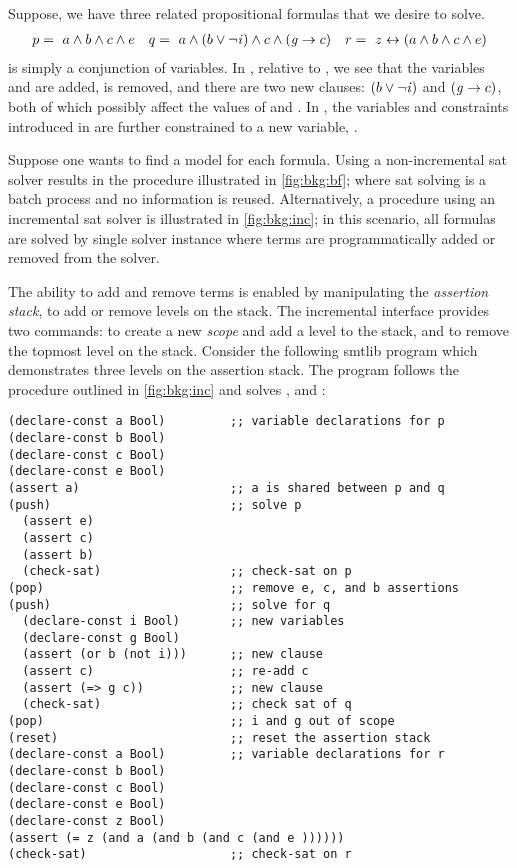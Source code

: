 \label{section:background-incremental}
%
%

%
%
Suppose, we have three related propositional formulas that we desire to solve.
%
\begin{align*}
  p =\ a \wedge b \wedge c \wedge e && q=\ a \wedge (b \vee \neg \mathit{i}{}) \wedge c \wedge (\mathit{g}{} \rightarrow c) && r =~z \leftrightarrow (a \wedge b \wedge c \wedge e)
\end{align*}
%
\pV{} is simply a conjunction of variables. In \qV{}, relative to \pV{}, we see
that the variables \iV{} and \gV{} are added, \eV{} is removed, and there are
two new clauses: $(b \vee \neg \mathit{i}{})$ and $(\mathit{g}{} \rightarrow c)$, both of
which possibly affect the values of \bV{} and \cV{}. In \rV{}, the variables and
constraints introduced in \pV{} are further constrained to a new variable,
\zV{}.

Suppose one wants to find a model for each formula. Using a non-incremental
\ac{sat} solver results in the procedure illustrated in \autoref{fig:bkg:bf};
where \ac{sat} solving is a batch process and no information is reused.
Alternatively, a procedure using an incremental \ac{sat} solver is illustrated
in \autoref{fig:bkg:inc}; in this scenario, all formulas are solved by single
solver instance where terms are programmatically added or removed from the
solver.

The ability to add and remove terms is enabled by manipulating the
\textit{assertion stack}, to add or remove levels on the stack. The incremental
interface provides two commands:  to create a new \emph{scope} and add
a level to the stack, and  to remove the topmost level on the stack.
Consider the following \acl{smtlib} program which demonstrates three levels on
the assertion stack. The program follows the procedure outlined in
\autoref{fig:bkg:inc} and solves \pV, \qV{} and \rV{}:

\begin{lstlisting}[columns=flexible,keepspaces=true,language=SMTLIB]
(declare-const a Bool)         ;; variable declarations for p
(declare-const b Bool)
(declare-const c Bool)
(declare-const e Bool)
(assert a)                     ;; a is shared between p and q
(push)                         ;; solve p
  (assert e)
  (assert c)
  (assert b)
  (check-sat)                  ;; check-sat on p
(pop)                          ;; remove e, c, and b assertions
(push)                         ;; solve for q
  (declare-const i Bool)       ;; new variables
  (declare-const g Bool)
  (assert (or b (not i)))      ;; new clause
  (assert c)                   ;; re-add c
  (assert (=> g c))            ;; new clause
  (check-sat)                  ;; check sat of q
(pop)                          ;; i and g out of scope
(reset)                        ;; reset the assertion stack
(declare-const a Bool)         ;; variable declarations for r
(declare-const b Bool)
(declare-const c Bool)
(declare-const e Bool)
(declare-const z Bool)
(assert (= z (and a (and b (and c (and e ))))))
(check-sat)                    ;; check-sat on r
\end{lstlisting}

